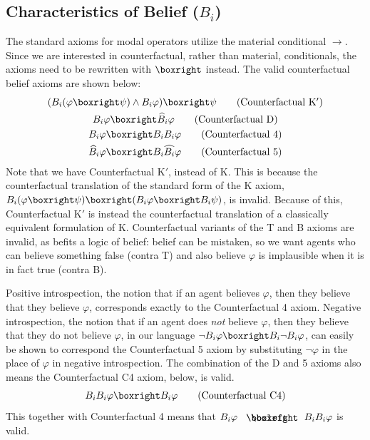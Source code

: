 \documentclass{article}
\begin{document}
\subsection{Characteristics of Belief ($B_i$)}
The standard axioms for modal operators utilize the material conditional $\longrightarrow$. Since we are interested in counterfactual, rather than material, conditionals, the axioms need to be rewritten with $\boxright$ instead. The valid counterfactual belief axioms are shown below:
\begin{gather}
    (B_i(\varphi\boxright\psi)\land B_i\varphi)\boxright\psi\tag{Counterfactual K$'$}\\
    B_i\varphi\boxright \widehat{B}_i\varphi\tag{Counterfactual D}\\
    B_i\varphi\boxright B_iB_i\varphi\tag{Counterfactual 4}\\
    \widehat{B}_i\varphi\boxright B_i\widehat{B_i}\varphi\tag{Counterfactual 5}
\end{gather}
Note that we have Counterfactual K$'$, instead of K. This is because the counterfactual translation of the standard form of the K axiom, $B_i(\varphi\boxright\psi)\boxright(B_i\varphi\boxright B_i\psi)$, is invalid. Because of this, Counterfactual K$'$ is instead the counterfactual translation of a classically equivalent formulation of K. Counterfactual variants of the T and B axioms are invalid, as befits a logic of belief: belief can be mistaken, so we want agents who can believe something false (contra T) and also believe $\varphi$ is implausible when it is in fact true (contra B).

Positive introspection, the notion that if an agent believes $\varphi$, then they believe that they believe $\varphi$, corresponds exactly to the Counterfactual 4 axiom. Negative introspection, the notion that if an agent does \textit{not} believe $\varphi$, then they believe that they do not believe $\varphi$, in our language $\lnot B_i\varphi\boxright B_i\lnot B_i\varphi$, can easily be shown to correspond the Counterfactual 5 axiom by substituting $\lnot\varphi$ in the place of $\varphi$ in negative introspection. The combination of the D and 5 axioms also means the Counterfactual C4 axiom, below, is valid.
\begin{equation}
    B_iB_i\varphi\boxright B_i\varphi\tag{Counterfactual C4}
\end{equation}
This together with Counterfactual 4 means that $B_i\varphi\boxiff B_iB_i\varphi$ is valid. 
\end{document}
